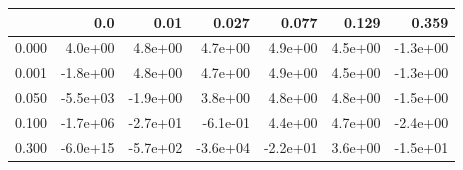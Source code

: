 \begin{tabular}{lrrrrrr}
\toprule
{} &      0.0 &     0.01 &    0.027 &    0.077 &   0.129 &    0.359 \\
\midrule
0.000 &  4.0e+00 &  4.8e+00 &  4.7e+00 &  4.9e+00 & 4.5e+00 & -1.3e+00 \\
0.001 & -1.8e+00 &  4.8e+00 &  4.7e+00 &  4.9e+00 & 4.5e+00 & -1.3e+00 \\
0.050 & -5.5e+03 & -1.9e+00 &  3.8e+00 &  4.8e+00 & 4.8e+00 & -1.5e+00 \\
0.100 & -1.7e+06 & -2.7e+01 & -6.1e-01 &  4.4e+00 & 4.7e+00 & -2.4e+00 \\
0.300 & -6.0e+15 & -5.7e+02 & -3.6e+04 & -2.2e+01 & 3.6e+00 & -1.5e+01 \\
\bottomrule
\end{tabular}
